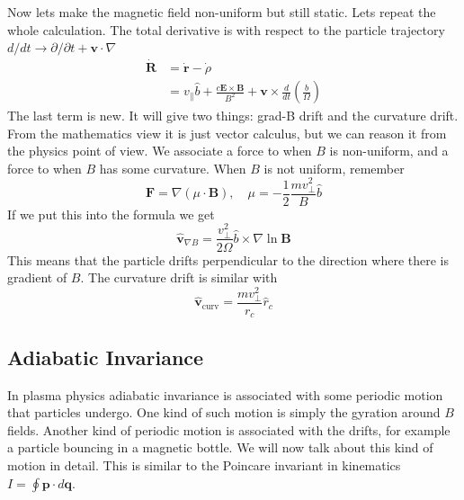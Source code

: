 \documentclass[letterpaper, 11pt]{article}
\numberwithin{equation}{section}
\numberwithin{figure}{section}
\begin{document}
Now lets make the magnetic field non-uniform but still static. Lets repeat the
whole calculation. The total derivative is with respect to the particle
trajectory $d/dt \to \partial/\partial t + \mathbf{v}\cdot\nabla$
\begin{equation}
  \label{eq:25}
  \begin{split}
    \dot{\mathbf{R}} &= \dot{\mathbf{r}} - \dot{\rho} \\
    &= v_{\parallel}\hat{b} + \frac{c \mathbf{E}\times \mathbf{B}}{B^2} + \mathbf{v}\times \frac{d}{dt}\left( \frac{\hat{b}}{\Omega} \right)
  \end{split}
\end{equation}
The last term is new. It will give two things: grad-B drift and the curvature
drift. From the mathematics view it is just vector calculus, but we can reason
it from the physics point of view. We associate a force to when $B$ is
non-uniform, and a force to when $B$ has some curvature. When $B$ is not
uniform, remember
\begin{equation}
  \label{eq:26}
  \mathbf{F} = \nabla \left( \mu \cdot \mathbf{B} \right), \quad \mu = -\frac{1}{2}\frac{mv_{\perp}^2}{B}\hat{b}
\end{equation}
If we put this into the formula we get
\begin{equation}
  \label{eq:27}
  \hat{\mathbf{v}}_{\nabla B} = \frac{v_{\perp}^2}{2\Omega}\hat{b}\times \nabla \ln \mathbf{B}
\end{equation}
This means that the particle drifts perpendicular to the direction where there
is gradient of $B$. The curvature drift is similar with
\begin{equation}
  \label{eq:28}
  \hat{\mathbf{v}}_\mathrm{curv} = \frac{m v_{\perp}^2}{r_{c}}\hat{r}_{c}
\end{equation}

\subsection{Adiabatic Invariance}

In plasma physics adiabatic invariance is associated with some periodic motion
that particles undergo. One kind of such motion is simply the gyration around $B$
fields. Another kind of periodic motion is associated with the drifts, for
example a particle bouncing in a magnetic bottle. We will now talk about this
kind of motion in detail. This is similar to the Poincare invariant in
kinematics $I = \oint \mathbf{p}\cdot d\mathbf{q}$.
\end{document}
